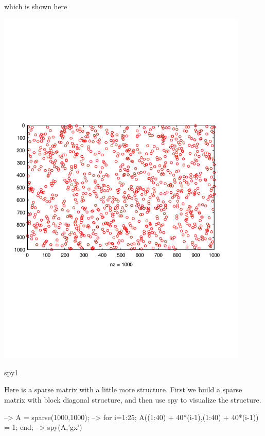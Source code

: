 which is shown here  
\begin{DoxyImage}
\includegraphics[width=12cm]{spy1}
\caption{spy1}
\end{DoxyImage}
 Here is a sparse matrix with a little more structure. First we build a sparse matrix with block diagonal structure, and then use {\ttfamily spy} to visualize the structure.


\begin{DoxyVerbInclude}
--> A = sparse(1000,1000);
--> for i=1:25; A((1:40) + 40*(i-1),(1:40) + 40*(i-1)) = 1; end;
--> spy(A,'gx')
\end{DoxyVerbInclude}


